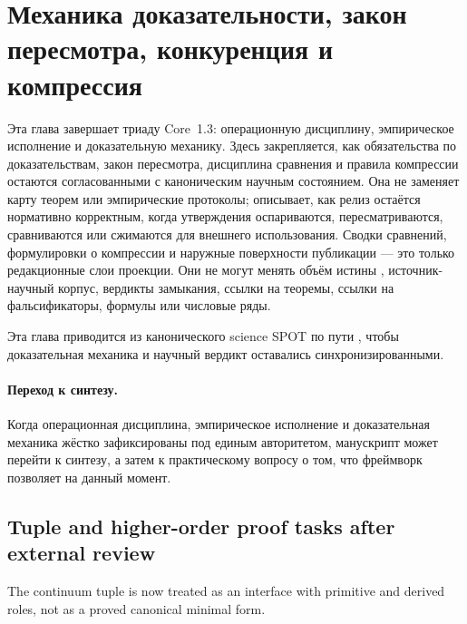 \section{Механика доказательности, закон пересмотра, конкуренция и компрессия}
\label{sec:oc-core-1-3-proof-machinery}

Эта глава завершает триаду Core~1.3: операционную дисциплину, эмпирическое
исполнение и доказательную механику. Здесь закрепляется, как обязательства
по доказательствам, закон пересмотра, дисциплина сравнения и правила
компрессии остаются согласованными с каноническим научным состоянием.
Она не заменяет карту теорем или эмпирические протоколы; описывает, как
релиз остаётся нормативно корректным, когда утверждения оспариваются,
пересматриваются, сравниваются или сжимаются для внешнего использования.
Сводки сравнений, формулировки о компрессии и наружные поверхности
публикации — это только редакционные слои проекции. Они не могут менять
объём истины , источник-научный корпус,
вердикты замыкания, ссылки на теоремы, ссылки на фальсификаторы,
формулы или числовые ряды.

Эта глава приводится из канонического science SPOT
 по пути
,
чтобы доказательная механика и научный вердикт оставались синхронизированными.



\paragraph{Переход к синтезу.}
Когда операционная дисциплина, эмпирическое исполнение и доказательная
механика жёстко зафиксированы под единым авторитетом, манускрипт может
перейти к синтезу, а затем к практическому вопросу о том, что фреймворк
позволяет на данный момент.


\subsection{Tuple and higher-order proof tasks after external review}
\label{sec:oc13-tuple-higher-order-obligations-v3}

The continuum tuple is now treated as an interface with primitive and derived
roles, not as a proved canonical minimal form.

